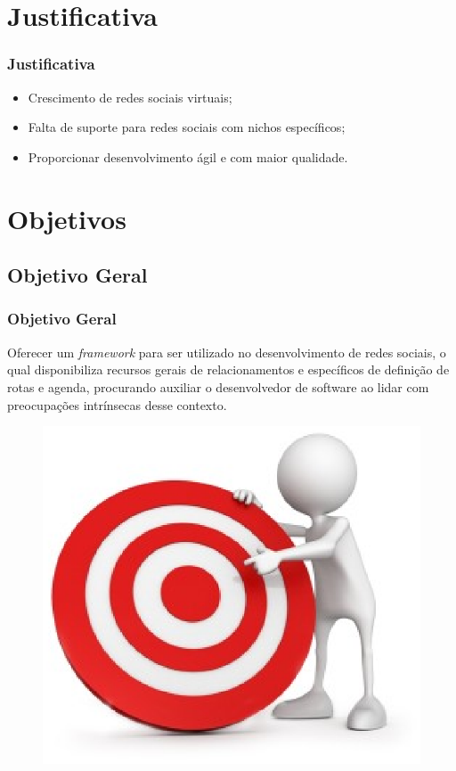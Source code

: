 \documentclass{beamer}
\begin{document}
\section{Justificativa}

\begin{frame}
\frametitle{Justificativa}

\begin{itemize}
	\item Crescimento de redes sociais virtuais;
	\item Falta de suporte para redes sociais com nichos específicos;
	\item Proporcionar desenvolvimento ágil e com maior qualidade.
\end{itemize}

\end{frame}


\section{Objetivos}
\subsection{Objetivo Geral}

\begin{frame}
\frametitle{Objetivo Geral}

Oferecer um \textit{framework} para ser utilizado no desenvolvimento de redes sociais, o qual disponibiliza recursos gerais de relacionamentos e específicos de definição de rotas e agenda, procurando auxiliar o desenvolvedor de software ao lidar com preocupações intrínsecas desse contexto.

\begin{figure}[h]
	\centering
	\includegraphics[scale=0.4]{figuras/objective.eps}
\end{figure}

\end{frame}
\end{document}
